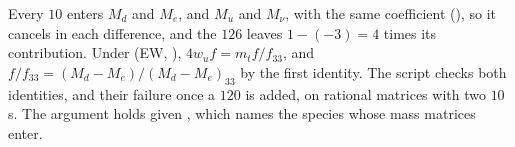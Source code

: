 Every $10$ enters $M_{d}$ and $M_{e}$, and $M_{u}$ and $M_{\nu}$, with the same coefficient (), so it cancels in each difference, and the $126$ leaves $1 - (-3) = 4$ times its contribution. Under (EW, ), $4w_{u}f = m_{t}f/f_{33}$, and $f/f_{33} = (M_{d} - M_{e})/(M_{d} - M_{e})_{33}$ by the first identity. The script checks both identities, and their failure once a $120$ is added, on rational matrices with two $10$s. The argument holds given , which names the species whose mass matrices enter.
